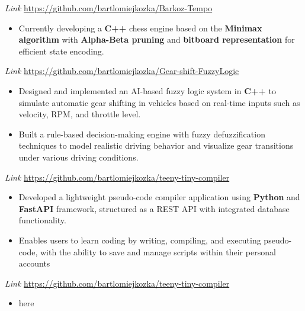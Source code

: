 \documentclass{article}
\begin{document}
\noindent
{}
\textit{Link}
\href{https://github.com/bartlomiejkozka/Barkoz-Tempo}{https://github.com/bartlomiejkozka/Barkoz-Tempo}
\begin{itemize}[itemsep=-3pt, topsep=3pt]
    \item Currently developing a \textbf{C++} chess engine based on the \textbf{Minimax algorithm} with \textbf{Alpha-Beta pruning} and \textbf{bitboard representation} for efficient state encoding.
\end{itemize}

\noindent
{}
\textit{Link}
\href{https://github.com/bartlomiejkozka/Gear-shift-FuzzyLogic}{https://github.com/bartlomiejkozka/Gear-shift-FuzzyLogic}
\begin{itemize}[itemsep=-3pt, topsep=3pt]
    \item Designed and implemented an AI-based fuzzy logic system in \textbf{C++} to simulate automatic gear shifting in vehicles based on real-time inputs such as velocity, RPM, and throttle level.
    \item Built a rule-based decision-making engine with fuzzy defuzzification techniques to model realistic driving behavior and visualize gear transitions under various driving conditions.
\end{itemize}

\noindent
{}
\textit{Link}
\href{https://github.com/bartlomiejkozka/teeny-tiny-compiler}{https://github.com/bartlomiejkozka/teeny-tiny-compiler}
\begin{itemize}[itemsep=-3pt, topsep=3pt]
    \item Developed a lightweight pseudo-code compiler application using \textbf{Python} and \textbf{FastAPI}
          framework, structured as a REST API with integrated database functionality.
    \item Enables users to learn coding by writing, compiling, and executing pseudo-code, with the
          ability to save and manage scripts within their personal accounts
\end{itemize}

\noindent
{}
\textit{Link}
\href{https://github.com/bartlomiejkozka/teeny-tiny-compiler}{https://github.com/bartlomiejkozka/teeny-tiny-compiler}
\begin{itemize}[itemsep=-3pt, topsep=3pt]
    \item here
\end{itemize}
\end{document}
